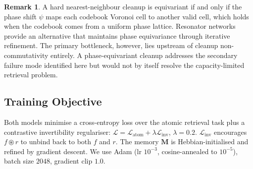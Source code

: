 \documentclass[11pt]{article}
\theoremstyle{definition}
\newtheorem{remark}[theorem]{Remark}
\newcommand{\bind}{\circledast}
\newcommand{\mem}{\mathbf{M}}
\begin{document}
\begin{remark}
\label{rem:hardcleanup}
A hard nearest-neighbour cleanup is equivariant if and only if the phase shift
$\psi$ maps each codebook Voronoi cell to another valid cell, which holds when
the codebook comes from a uniform phase lattice. Resonator
networks~\cite{frady2020resonator} provide an alternative that maintains phase
equivariance through iterative refinement. The primary bottleneck, however, lies
upstream of cleanup non-commutativity entirely. A phase-equivariant cleanup
addresses the secondary failure mode identified here but would not by itself
resolve the capacity-limited retrieval problem.
\end{remark}

\subsection{Training Objective}
\label{sec:method-training}

Both models minimise a cross-entropy loss over the atomic retrieval task plus a
contrastive invertibility regulariser:
$\mathcal{L} = \mathcal{L}_{\text{atom}} + \lambda \mathcal{L}_{\text{inv}}$,
$\lambda = 0.2$. $\mathcal{L}_{\text{inv}}$ encourages $f \bind r$ to unbind
back to both $f$ and $r$. The memory $\mem$ is Hebbian-initialised and refined
by gradient descent. We use Adam (lr $10^{-3}$, cosine-annealed to $10^{-5}$),
batch size $2048$, gradient clip $1.0$.
\end{document}
